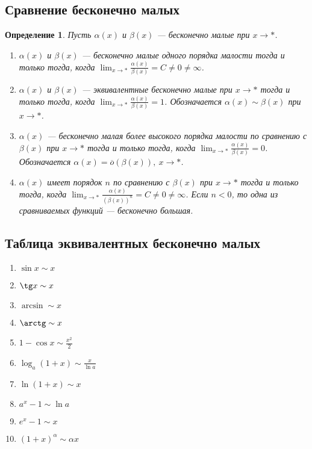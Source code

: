 \documentclass[a4paper,12pt]{article} %
\newtheorem{definition}{Определение}[section]
\theoremstyle{remark}
\theoremstyle{definition}
\begin{document}
\subsection{Сравнение бесконечно малых}
\begin{definition}
	Пусть $\alpha(x)$ и $\beta(x)$ --- бесконечно малые при $x\to *$.
	\begin{enumerate}
		\item $\alpha(x)$ и $\beta(x)$ --- бесконечно малые одного порядка малости тогда и только тогда, когда
            $\displaystyle \lim_{x \to *} \frac{\alpha(x)}{\beta(x)} = C\neq 0\neq \infty$.
        \item $\alpha(x)$ и $\beta(x)$ --- эквивалентные бесконечно малые при $x\to *$ тогда и только тогда, когда
            $\displaystyle \lim_{x \to *} \frac{\alpha(x)}{\beta(x)} = 1$. Обозначается $\alpha(x) \sim \beta(x)$ при
            $x\to *$.
		\item $\alpha(x)$ --- бесконечно малая более высокого порядка малости по сравнению с $\beta(x)$ при $x\to *$ 
            тогда и только тогда, когда $\displaystyle \lim_{x \to *} \frac{\alpha(x)}{\beta(x)} = 0$.
            Обозначается $\alpha(x) = \overline{o}(\beta(x)), \ x \to *$.
        \item $\alpha(x)$ имеет порядок $n$ по сравнению с $\beta(x)$ при $x\to *$ тогда и только тогда, когда
            $\displaystyle \lim_{x \to *} \frac{\alpha(x)}{(\beta(x))^{n}} = C \neq 0 \neq \infty$.
            Если $n<0$, то одна из сравниваемых функций --- бесконечно большая.
	\end{enumerate}
\end{definition}

\subsection{Таблица эквивалентных бесконечно малых}
\begin{enumerate}
	\item $\sin x \sim x$
	\item $\tg x \sim x$
	\item $\arcsin \sim x$
	\item $\arctg \sim x$
	\item $1 - \cos x \sim \frac{x^2}{2}$
	\item $\log_a(1+x) \sim \frac{x}{\ln a}$
	\item $\ln(1+x) \sim x$
	\item $a^{x} - 1 \sim \ln a$
	\item $e^{x} - 1 \sim x$
	\item $(1+x)^{\alpha} \sim \alpha x$
\end{enumerate}
\end{document}
